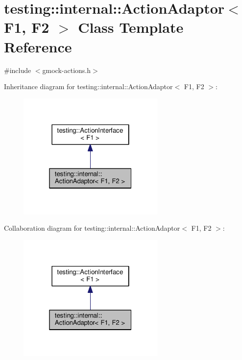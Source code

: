 \hypertarget{classtesting_1_1internal_1_1ActionAdaptor}{}\section{testing\+:\+:internal\+:\+:Action\+Adaptor$<$ F1, F2 $>$ Class Template Reference}
\label{classtesting_1_1internal_1_1ActionAdaptor}


{\ttfamily \#include $<$gmock-\/actions.\+h$>$}



Inheritance diagram for testing\+:\+:internal\+:\+:Action\+Adaptor$<$ F1, F2 $>$\+:\nopagebreak
\begin{figure}[H]
\begin{center}
\leavevmode
\includegraphics[width=205pt]{classtesting_1_1internal_1_1ActionAdaptor__inherit__graph}
\end{center}
\end{figure}


Collaboration diagram for testing\+:\+:internal\+:\+:Action\+Adaptor$<$ F1, F2 $>$\+:\nopagebreak
\begin{figure}[H]
\begin{center}
\leavevmode
\includegraphics[width=205pt]{classtesting_1_1internal_1_1ActionAdaptor__coll__graph}
\end{center}
\end{figure}
